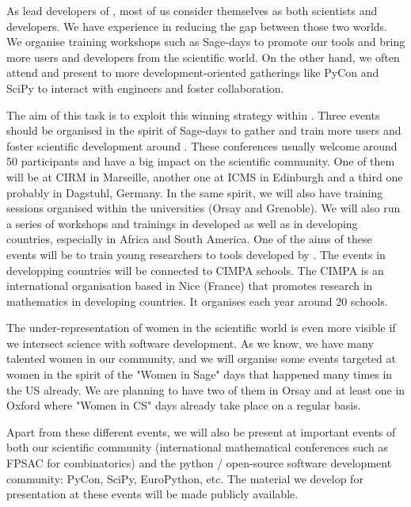 \begin{workpackage}
\begin{tasklist}
\begin{task}[title=Dissemination: reaching towards users and fostering diversity, lead=PS,PM=12, partners={UB,USH,SA}, id=dissemination, wphases=0-48, issue=28]
  As lead developers of \TheProject, most of us consider themselves as
  both scientists and developers. We have experience in reducing the
  gap between those two worlds. We organise training workshops such
  as Sage-days to promote our tools and bring more users and
  developers from the scientific world. On the other hand, we often
  attend and present to more development-oriented gatherings like
  PyCon and SciPy to interact with engineers and foster
  collaboration.

  The aim of this task is to exploit this winning strategy within
  \TheProject. Three events should be organised in the spirit of
  Sage-days to gather and train more users and foster scientific
  development around \TheProject. These conferences usually welcome
  around 50 participants and have a big impact on the scientific
  community. One of them will be at CIRM in Marseille, another one at
  ICMS in Edinburgh and a third one probably in Dagstuhl, Germany. In
  the same spirit, we will also have training sessions organised
  within the universities (Orsay and Grenoble). 
  We will also run a series of workshops and trainings in developed as well as 
  in developing countries, especially in Africa and
  South America. One of the aims of these events will be to train young researchers
  to tools developed by  \Theproject. The events in developping countries will
  be connected to CIMPA schools.  The CIMPA is an international organisation based in Nice
  (France) that promotes research in mathematics in developing
  countries. It organises each year around 20 schools.

  The under-representation of women in the scientific world is even
  more visible if we intersect science with software
  development. As we know, we have many talented women in our
  community, and we will organise some events targeted at women in the
  spirit of the "Women in Sage" days that happened many times in the
  US already. We are planning to have two of them in Orsay and at least
  one in Oxford where "Women in CS" days already take place on a regular basis.

  Apart from these different events, we will also be present at
  important events of both our scientific community (international
  mathematical conferences such as FPSAC for combinatorics) and the
  python / open-source software development community: PyCon, SciPy,
  EuroPython, etc. The material we develop for presentation at these
  events will be made publicly available.
\end{task}



\end{tasklist}
\end{workpackage}
